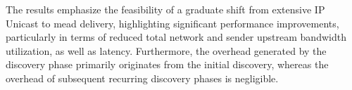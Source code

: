 \begin{itemize}
    The results emphasize the feasibility of a graduate shift from extensive
        IP Unicast to \gls{mead} delivery, highlighting significant performance
        improvements, particularly in terms of reduced total network and sender
        upstream bandwidth utilization, as well as latency.
    Furthermore, the overhead generated by the discovery phase primarily
        originates from the initial discovery, whereas the overhead of
        subsequent recurring discovery phases is negligible.
\end{itemize}



